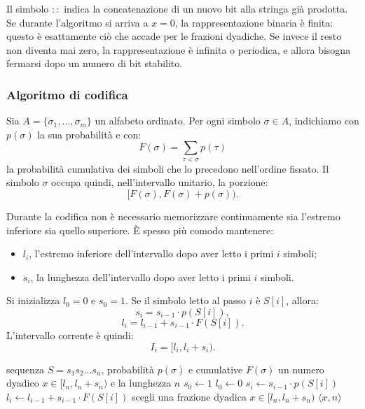 \documentclass{article}
\theoremstyle{definition}
\numberwithin{equation}{section}
\begin{document}
Il simbolo $::$ indica la concatenazione di un nuovo bit alla stringa già prodotta. Se durante l'algoritmo si arriva a $x=0$, la rappresentazione binaria è finita: questo è esattamente ciò che accade per le frazioni dyadiche. Se invece il resto non diventa mai zero, la rappresentazione è infinita o periodica, e allora bisogna fermarsi dopo un numero di bit stabilito.

\subsubsection{Algoritmo di codifica}
Sia $A=\{\sigma_1,\ldots,\sigma_m\}$ un alfabeto ordinato. Per ogni simbolo $\sigma\in A$, indichiamo con $p(\sigma)$ la sua probabilità e con:
\[
    F(\sigma)
    =
    \sum_{\tau < \sigma} p(\tau)
\]
la probabilità cumulativa dei simboli che lo precedono nell'ordine fissato. Il simbolo $\sigma$ occupa quindi, nell'intervallo unitario, la porzione:
\[
    [F(\sigma),F(\sigma)+p(\sigma)).
\]

Durante la codifica non è necessario memorizzare continuamente sia l'estremo inferiore sia quello superiore. È spesso più comodo mantenere:
\begin{itemize}
    \item $l_i$, l'estremo inferiore dell'intervallo dopo aver letto i primi $i$ simboli;
    \item $s_i$, la lunghezza dell'intervallo dopo aver letto i primi $i$ simboli.
\end{itemize}
Si inizializza $l_0=0$ e $s_0=1$. Se il simbolo letto al passo $i$ è $S[i]$, allora:
\begin{equation}\label{eq:arithmetic_update_size}
    s_i=s_{i-1}\cdot p(S[i]),
\end{equation}
\begin{equation}\label{eq:arithmetic_update_low}
    l_i=l_{i-1}+s_{i-1}\cdot F(S[i]).
\end{equation}
L'intervallo corrente è quindi:
\[
    I_i=[l_i,l_i+s_i).
\]

\begin{algorithm}[htpb]
    \caption{Codifica aritmetica statica}
    \label{alg:arithmetic_coding}
    \begin{algorithmic}[1]
        \Require sequenza $S=s_1s_2\ldots s_n$, probabilità $p(\sigma)$ e cumulative $F(\sigma)$
        \Ensure un numero dyadico $x\in[l_n,l_n+s_n)$ e la lunghezza $n$
        \State $s_0 \gets 1$
        \State $l_0 \gets 0$
        \State $s_i \gets s_{i-1}\cdot p(S[i])$
        \State $l_i \gets l_{i-1}+s_{i-1}\cdot F(S[i])$
        \EndFor
        \State scegli una frazione dyadica $x\in[l_n,l_n+s_n)$
        \State \Return $\langle x,n\rangle$
    \end{algorithmic}
\end{algorithm}
\end{document}
